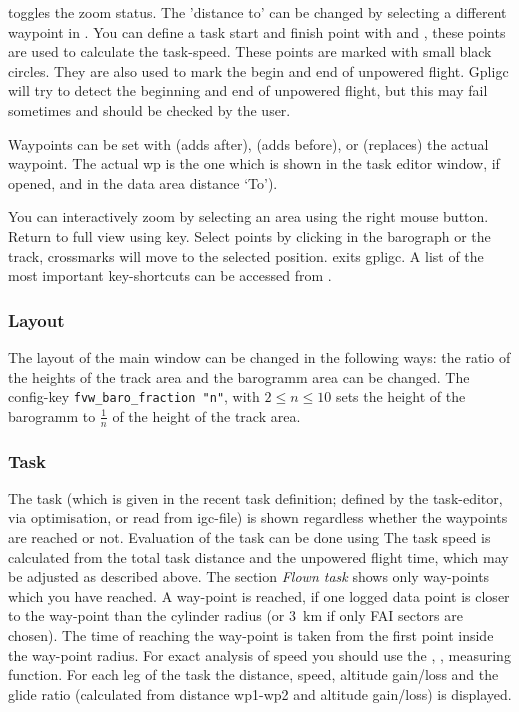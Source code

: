  toggles the zoom status.
The 'distance to' can be changed by selecting a different waypoint in .
You can define a task start and finish point with  and , these points are
used to calculate the task-speed. These points are marked with small black circles.
They are also used to mark the begin and end of unpowered flight.
Gpligc will try to detect the beginning and end of unpowered flight, but this may fail sometimes and should be checked by the user.

Waypoints can be set with  (adds after),  (adds before), or  (replaces) the actual waypoint.
The actual wp is the one which is shown in the task editor window, if opened, and in the data area distance `To').

You can interactively zoom by selecting an area using the right mouse button. Return to full view using  key.
Select points by clicking in the barograph or the track, crossmarks will move to the selected position.
 exits gpligc.
A list of the most important key-shortcuts can be accessed from .

\subsubsection{Layout}
The layout of the main window can be changed in the following ways:
the ratio of the heights of the track area and the barogramm area can be changed.
The config-key \texttt{fvw\_baro\_fraction "n"}, with $2 \le n \le 10$ sets the height of the barogramm to $\frac{1}{n}$ of the height of the track area.


\subsubsection{Task}
The task (which is given in the recent task definition; defined by the task-editor, via optimisation, or read from igc-file) is shown regardless whether the waypoints are reached or not.
Evaluation of the task can be done using 
The task speed is calculated from the total task distance and the unpowered flight time, which may be adjusted as described above.
The section \emph{Flown task} shows only way-points which you have reached. A way-point is reached, if one logged data point is closer to the way-point than the cylinder radius (or 3~km if only FAI sectors are chosen). The time of reaching the way-point is taken from the first point inside the way-point radius.
For exact analysis of speed you should use the , ,  measuring function.
For each leg of the task the distance, speed, altitude gain/loss and the glide ratio (calculated from distance wp1-wp2 and altitude gain/loss) is displayed.


